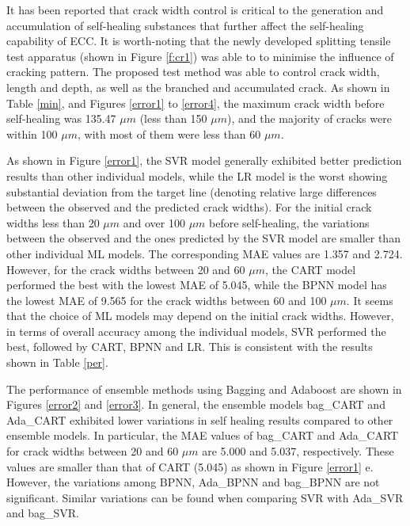\documentclass[11pt]{article}
\begin{document}
	It has been reported that crack width control is critical to the generation and accumulation of self-healing substances \cite{vidal2004analyzing,wang1997permeability,reinhardt2003permeability,edvardsen1999water,qiu2016coupled} that further affect the self-healing capability of ECC. It is worth-noting that the newly developed splitting tensile test apparatus (shown in Figure \ref{f:cr1}) was able to to minimise the influence of cracking pattern. The proposed test method was able to control crack width, length and depth, as well as the branched and accumulated crack. As shown in Table \ref{min}, and Figures \ref{error1} to \ref{error4}, the maximum crack width before self-healing was 135.47 $\mu m$ (less than 150 $\mu m$), and the majority of cracks were within 100 $\mu m$, with most of them were less than 60 $\mu m$. 

    As shown in Figure \ref{error1}, the SVR model generally exhibited better prediction results than other individual models, while the LR model is the worst showing substantial deviation from the target line (denoting relative large differences between the observed and the predicted crack widths). For the initial crack widths less than 20 $\mu m$ and over 100 $\mu m$ before self-healing, the variations between the observed and the ones predicted by the SVR model are smaller than other individual ML models. The corresponding MAE values  are 1.357 and 2.724. However, for the crack widths between 20 and 60 $\mu m$, the CART model performed the best with the lowest MAE of 5.045, while the BPNN model has the lowest MAE of 9.565 for the crack widths between 60 and 100 $\mu m$. It seems that the choice of ML models may depend on the initial crack widths. However, in terms of overall accuracy among the individual models, SVR performed the best, followed by CART, BPNN and LR. This is consistent with the results shown in Table \ref{per}. 
	
    The performance of ensemble methods using Bagging and Adaboost are shown in Figures \ref{error2} and \ref{error3}. In general, the ensemble models  bag\_CART and Ada\_CART exhibited lower variations in self healing results compared to other ensemble models. In particular, the MAE values of bag\_CART and Ada\_CART for crack widths between 20 and 60 $\mu m$ are 5.000 and 5.037, respectively. These values are smaller than that of CART (5.045) as shown in Figure \ref{error1} e. However, the variations among BPNN, Ada\_BPNN and bag\_BPNN are not significant. Similar variations can be found when comparing SVR with Ada\_SVR and bag\_SVR.
    
\end{document}
